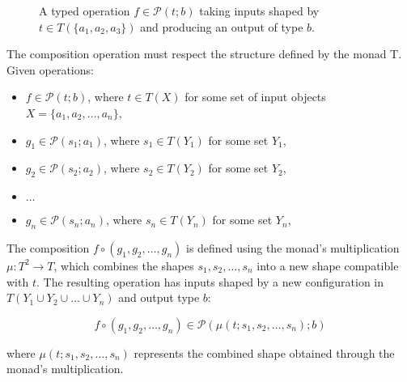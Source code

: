 \begin{figure}[h]
\centering
{}
\caption{A typed operation $f \in \mathcal{P}(t; b)$ taking inputs shaped by $t \in T(\{a_1, a_2, a_3\})$ and producing an output of type $b$.}
\label{fig:shaped-operation}
\end{figure}

The composition operation must respect the structure defined by the monad T. Given operations:
\begin{itemize}
  \item $f \in \mathcal{P}(t; b)$, where $t \in T(X)$ for some set of input objects $X = \{a_1, a_2, \ldots, a_n\}$,
  \item $g_1 \in \mathcal{P}(s_1; a_1)$, where $s_1 \in T(Y_1)$ for some set $Y_1$,
  \item $g_2 \in \mathcal{P}(s_2; a_2)$, where $s_2 \in T(Y_2)$ for some set $Y_2$,
  \item $\ldots$
  \item $g_n \in \mathcal{P}(s_n; a_n)$, where $s_n \in T(Y_n)$ for some set $Y_n$,
\end{itemize}

The composition $f \circ (g_1, g_2, \ldots, g_n)$ is defined using the monad's multiplication $\mu: T^2 \to T$, which combines the shapes $s_1, s_2, \ldots, s_n$ into a new shape compatible with $t$. The resulting operation has inputs shaped by a new configuration in $T(Y_1 \cup Y_2 \cup \ldots \cup Y_n)$ and output type $b$:

\begin{equation}
  f \circ (g_1, g_2, \ldots, g_n) \in \mathcal{P}(\mu(t; s_1, s_2, \ldots, s_n); b)
\end{equation}

where $\mu(t; s_1, s_2, \ldots, s_n)$ represents the combined shape obtained through the monad's multiplication.


